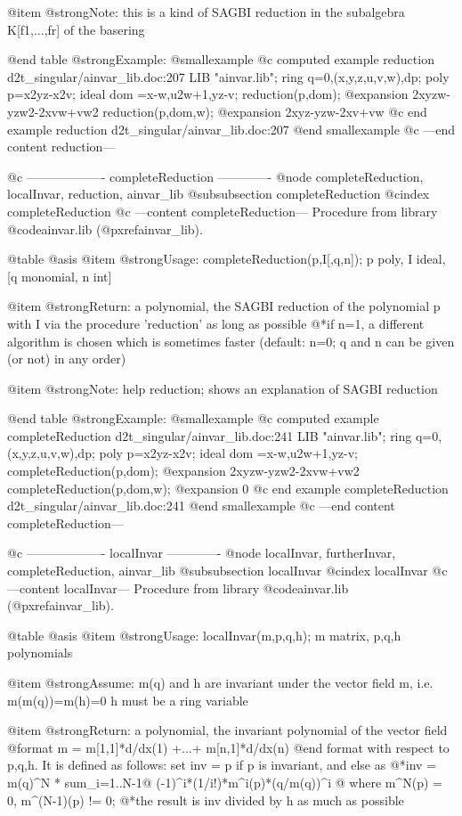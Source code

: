 @item @strong{Note:}
this is a kind of SAGBI reduction in the subalgebra K[f1,...,fr] of
the basering

@end table
@strong{Example:}
@smallexample
@c computed example reduction d2t_singular/ainvar_lib.doc:207 
LIB "ainvar.lib";
ring q=0,(x,y,z,u,v,w),dp;
poly p=x2yz-x2v;
ideal dom =x-w,u2w+1,yz-v;
reduction(p,dom);
@expansion{} 2xyzw-yzw2-2xvw+vw2
reduction(p,dom,w);
@expansion{} 2xyz-yzw-2xv+vw
@c end example reduction d2t_singular/ainvar_lib.doc:207
@end smallexample
@c ---end content reduction---

@c ------------------- completeReduction -------------
@node completeReduction, localInvar, reduction, ainvar_lib
@subsubsection completeReduction
@cindex completeReduction
@c ---content completeReduction---
Procedure from library @code{ainvar.lib} (@pxref{ainvar_lib}).

@table @asis
@item @strong{Usage:}
completeReduction(p,I[,q,n]); p poly, I ideal, [q monomial, n int]

@item @strong{Return:}
a polynomial, the SAGBI reduction of the polynomial p with I
via the procedure 'reduction' as long as possible
@*if n=1, a different algorithm is chosen which is sometimes faster
(default: n=0; q and n can be given (or not) in any order)

@item @strong{Note:}
help reduction; shows an explanation of SAGBI reduction

@end table
@strong{Example:}
@smallexample
@c computed example completeReduction d2t_singular/ainvar_lib.doc:241 
LIB "ainvar.lib";
ring q=0,(x,y,z,u,v,w),dp;
poly p=x2yz-x2v;
ideal dom =x-w,u2w+1,yz-v;
completeReduction(p,dom);
@expansion{} 2xyzw-yzw2-2xvw+vw2
completeReduction(p,dom,w);
@expansion{} 0
@c end example completeReduction d2t_singular/ainvar_lib.doc:241
@end smallexample
@c ---end content completeReduction---

@c ------------------- localInvar -------------
@node localInvar, furtherInvar, completeReduction, ainvar_lib
@subsubsection localInvar
@cindex localInvar
@c ---content localInvar---
Procedure from library @code{ainvar.lib} (@pxref{ainvar_lib}).

@table @asis
@item @strong{Usage:}
localInvar(m,p,q,h); m matrix, p,q,h polynomials

@item @strong{Assume:}
m(q) and h are invariant under the vector field m, i.e. m(m(q))=m(h)=0
h must be a ring variable

@item @strong{Return:}
a polynomial, the invariant polynomial of the vector field
@format
         m = m[1,1]*d/dx(1) +...+ m[n,1]*d/dx(n)
@end format
with respect to p,q,h. It is defined as follows: set inv = p if p is
invariant, and else as
@*inv = m(q)^N * sum_i=1..N-1@{ (-1)^i*(1/i!)*m^i(p)*(q/m(q))^i @}
where m^N(p) = 0, m^(N-1)(p) != 0;
@*the result is inv divided by h as much as possible

